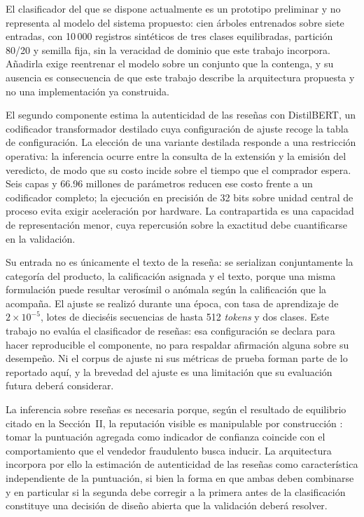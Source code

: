 El clasificador del que se dispone actualmente es un prototipo preliminar y no representa al
modelo del sistema propuesto: cien árboles entrenados sobre siete entradas, con 10\,000
registros sintéticos de tres clases equilibradas, partición 80/20 y semilla fija, sin la
veracidad de dominio que este trabajo incorpora. Añadirla exige reentrenar el modelo sobre un conjunto que la
contenga, y su ausencia es consecuencia de que este trabajo describe la arquitectura propuesta
y no una implementación ya construida.

El segundo componente estima la autenticidad de las reseñas con DistilBERT, un codificador
transformador destilado cuya configuración de ajuste recoge la tabla de configuración. La
elección de una variante destilada responde a una restricción operativa: la inferencia ocurre
entre la consulta de la extensión y la emisión del veredicto, de modo que su costo incide
sobre el tiempo que el comprador espera. Seis capas y 66.96 millones de parámetros reducen
ese costo frente a un codificador completo; la ejecución en precisión de 32 bits sobre unidad
central de proceso evita exigir aceleración por hardware. La contrapartida es una capacidad de
representación menor, cuya repercusión sobre la exactitud debe cuantificarse en la validación.

Su entrada no es únicamente el texto de la reseña: se serializan conjuntamente la categoría del
producto, la calificación asignada y el texto, porque una misma formulación puede resultar
verosímil o anómala según la calificación que la acompaña. El ajuste se realizó durante una
época, con tasa de aprendizaje de $2\times10^{-5}$, lotes de dieciséis secuencias de hasta 512
\textit{tokens} y dos clases. Este trabajo no evalúa el clasificador de reseñas: esa
configuración se declara para hacer reproducible el componente, no para respaldar afirmación
alguna sobre su desempeño. Ni el corpus de ajuste ni sus métricas de prueba forman parte de lo
reportado aquí, y la brevedad del ajuste es una limitación que su evaluación futura deberá
considerar.

La inferencia sobre reseñas es necesaria porque, según el resultado de equilibrio citado en
la Sección~II, la reputación visible es manipulable por construcción \cite{ref29}: tomar la
puntuación agregada como indicador de confianza coincide con el comportamiento que el vendedor
fraudulento busca inducir. La arquitectura incorpora por ello la estimación de autenticidad de
las reseñas como característica independiente de la puntuación, si bien la forma en que ambas
deben combinarse   y en particular si la segunda debe corregir a la primera antes de la
clasificación   constituye una decisión de diseño abierta que la validación deberá resolver.

